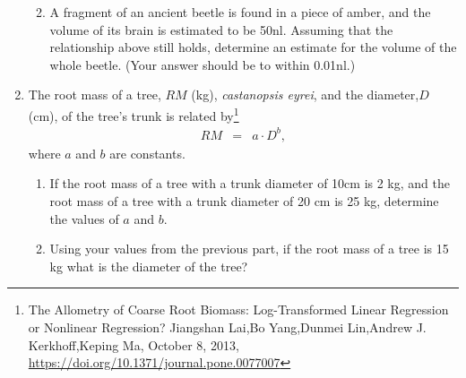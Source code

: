 \begin{enumerate}
\begin{enumerate}
    \vfill
    
  \item A fragment of an ancient beetle is found in a piece of amber,
    and the volume of its brain is estimated to be 50nl. Assuming that
    the relationship above still holds, determine an estimate for the
    volume of the whole beetle.  (Your answer should be to within
    0.01nl.)

    \vfill
    
  \end{enumerate}

  \clearpage

\item The root mass of a tree, $RM$ (kg), \textit{castanopsis eyrei},
  and the diameter,$D$ (cm), of the tree's trunk is related
  by\footnote{The Allometry of Coarse Root Biomass: Log-Transformed
    Linear Regression or Nonlinear Regression?  Jiangshan Lai,Bo
    Yang,Dunmei Lin,Andrew J. Kerkhoff,Keping Ma, October 8, 2013,
    \url{https://doi.org/10.1371/journal.pone.0077007}}
  \begin{eqnarray*}
    RM & = & a \cdot D^{b},
  \end{eqnarray*}
  where $a$ and $b$ are constants.
  \begin{enumerate}
  \item If the root mass of a tree with a trunk diameter of 10cm is 2
    kg, and the root mass of a tree with a trunk diameter of 20 cm is
    25 kg, determine the values of $a$ and $b$.

    \vfill

  \item Using your values from the previous part, if the root mass of
    a tree is 15 kg what is the diameter of the tree?

    \vfill
      
  \end{enumerate}

%
%


\end{enumerate}


